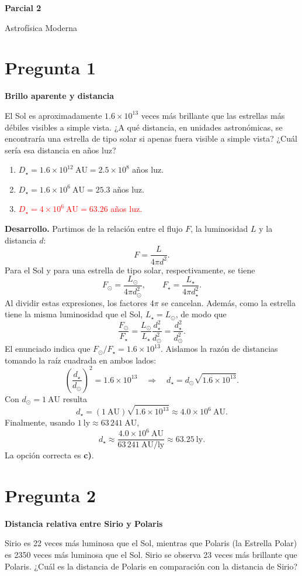 \documentclass[a4paper,11pt]{article}
\newcommand{\pregunta}[2]{\section*{Pregunta #1}\textbf{#2}\par}
\begin{document}
\begin{center}
    {\LARGE\bfseries Parcial 2\par}
    \medskip
    {\large Astrofísica Moderna\par}
\end{center}

\pregunta{1}{Brillo aparente y distancia}

El Sol es aproximadamente $1.6\times10^{13}$ veces más brillante que las estrellas más débiles visibles a simple vista. ¿A qué distancia, en unidades astronómicas, se encontraría una estrella de tipo solar si apenas fuera visible a simple vista? ¿Cuál sería esa distancia en años luz?

\begin{enumerate}
    \item $D_{\star}=1.6\times10^{12}\ \mathrm{AU}=2.5\times10^8$ años luz.
    \item $D_{\star}=1.6\times10^6\ \mathrm{AU}=25.3$ años luz.
    \item \textcolor{red}{$D_{\star}=4\times10^6\ \mathrm{AU}=63.26$ años luz.}
\end{enumerate}

\textbf{Desarrollo.} Partimos de la relación entre el flujo $F$, la luminosidad $L$ y la distancia $d$:
\[
F=\frac{L}{4\pi d^2}.
\]
Para el Sol y para una estrella de tipo solar, respectivamente, se tiene
\[
F_\odot=\frac{L_\odot}{4\pi d_\odot^2},
\qquad
F_\star=\frac{L_\star}{4\pi d_\star^2}.
\]
Al dividir estas expresiones, los factores $4\pi$ se cancelan. Además, como la estrella tiene la misma luminosidad que el Sol, $L_\star=L_\odot$, de modo que
\[
\frac{F_\odot}{F_\star}
=\frac{L_\odot}{L_\star}\frac{d_\star^2}{d_\odot^2}
=\frac{d_\star^2}{d_\odot^2}.
\]
El enunciado indica que $F_\odot/F_\star=1.6\times10^{13}$. Aislamos la razón de distancias tomando la raíz cuadrada en ambos lados:
\[
\left(\frac{d_\star}{d_\odot}\right)^2=1.6\times10^{13}
\quad\Longrightarrow\quad
d_\star=d_\odot\sqrt{1.6\times10^{13}}.
\]
Con $d_\odot=1\ \mathrm{AU}$ resulta
\[
d_\star=(1\ \mathrm{AU})\sqrt{1.6\times10^{13}}
\approx4.0\times10^6\ \mathrm{AU}.
\]
Finalmente, usando $1\ \mathrm{ly}\approx63\,241\ \mathrm{AU}$,
\[
d_\star\approx\frac{4.0\times10^6\ \mathrm{AU}}{63\,241\ \mathrm{AU/ly}}
\approx63.25\ \mathrm{ly}.
\]
La opción correcta es \textbf{c)}. \parencite[Sec. 7.3.1, p. 233]{chaparro2026}

\pregunta{2}{Distancia relativa entre Sirio y Polaris}

Sirio es 22 veces más luminosa que el Sol, mientras que Polaris (la Estrella Polar) es 2350 veces más luminosa que el Sol. Sirio se observa 23 veces más brillante que Polaris. ¿Cuál es la distancia de Polaris en comparación con la distancia de Sirio?
\end{document}
